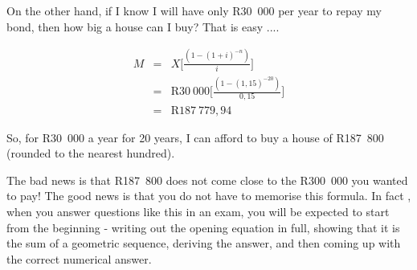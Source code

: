 On the other hand, if I know I will have only R30~000 per year to repay my bond, then how big a house can I buy? That is easy ....

\begin{eqnarray*}
M &=& X \biggl[\frac{(1-(1+i)^{-n})}{i}\biggr]\\
&=& \mbox{R}30~000 \biggl[\frac{(1-(1,15)^{-20})}{0,15}\biggr]\\
&=& \mbox{R}187~779,94
\end{eqnarray*}

So, for R30~000 a year for 20 years, I can afford to buy a house of R187~800 (rounded to the nearest hundred).

The bad news is that R187~800 does not come close to the R300~000 you wanted to pay! The good news is that you do not have to memorise this formula. In fact , when you answer questions like this in an exam, you will be expected to start from the beginning - writing out the opening equation in full, showing that it is the sum of a geometric sequence, deriving the answer, and then coming up with the correct numerical answer.

